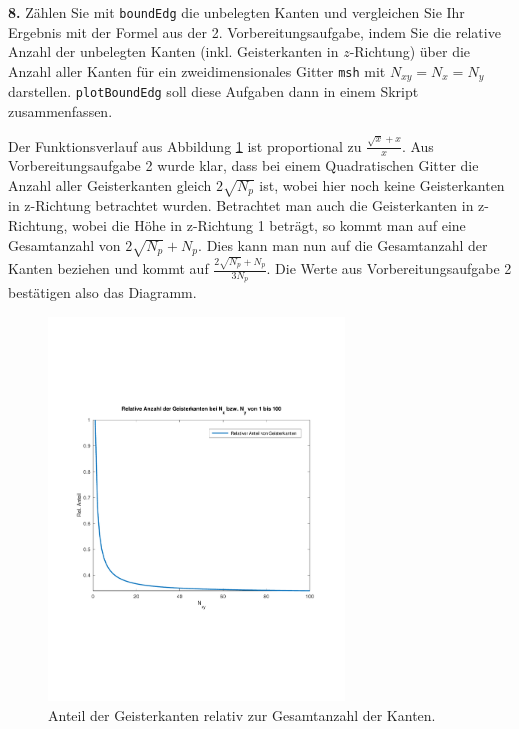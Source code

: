\documentclass[Protokollheft.tex]{subfiles}
\begin{document}
        \begin{framed}
	\noindent \textbf{8.} Zählen Sie mit \lstinline{boundEdg} die unbelegten Kanten und vergleichen Sie Ihr Ergebnis mit
                    der Formel aus der 2. Vorbereitungsaufgabe, indem Sie die relative Anzahl der
                    unbelegten Kanten (inkl. Geisterkanten in $z$-Richtung) über die Anzahl aller Kanten für ein zweidimensionales Gitter \lstinline{msh} mit $N_{xy}=N_x=N_y$ darstellen. \lstinline{plotBoundEdg} soll diese Aufgaben dann in einem Skript zusammenfassen.\label{exer:plotBoundEdg}
\end{framed}
\noindent
	Der Funktionsverlauf aus Abbildung \ref{Abb:boundEdg} ist proportional zu $\frac{\sqrt{x}+x}{x}$. Aus Vorbereitungsaufgabe 2 wurde klar, dass bei einem Quadratischen Gitter die Anzahl aller Geisterkanten gleich $2\sqrt{N_p}$ ist, wobei hier noch keine Geisterkanten in z-Richtung betrachtet wurden. Betrachtet man auch die Geisterkanten in z-Richtung, wobei die Höhe in z-Richtung 1 beträgt, so kommt man auf eine Gesamtanzahl von $2\sqrt{N_p}+N_p$. Dies kann man nun auf die Gesamtanzahl der Kanten beziehen und kommt auf $\frac{2\sqrt{N_p}+N_p}{3N_p}$. Die Werte aus Vorbereitungsaufgabe 2 bestätigen also das Diagramm.

	\begin{figure}[h]
	\centering
	\includegraphics[trim = 15mm 65mm 15mm 60mm, clip, width=0.7\textwidth]{plotBoundEdg.pdf}
	\caption{Anteil der Geisterkanten relativ zur Gesamtanzahl der Kanten.}
	\label{Abb:boundEdg}
	\end{figure}
\end{document}
